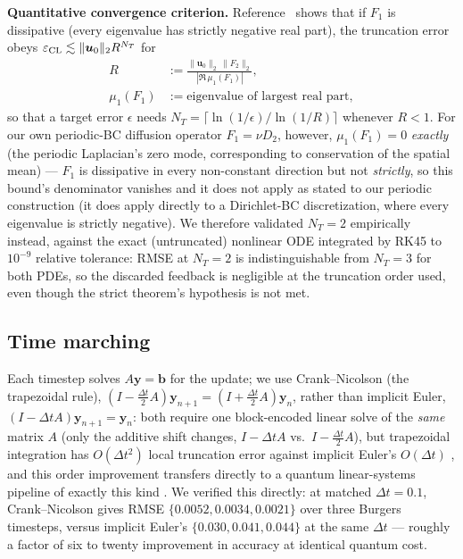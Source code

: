 \documentclass[aps,pra,twocolumn,notitlepage,superscriptaddress,floatfix,10pt]{revtex4-2}
\newcommand{\norm}[1]{\lVert #1 \rVert}
\begin{document}
\textbf{Quantitative convergence criterion.} Reference~\cite{Liu2021} shows that if $F_1$ is
dissipative (every eigenvalue has strictly negative real part), the truncation error obeys
$\varepsilon_{\rm CL}\lesssim\norm{\bm u_0}_2R^{N_T}$ for
\begin{align}
R&:=\frac{\norm{\bm u_0}_2\,\norm{F_2}_2}{|\Re\,\mu_1(F_1)|},\\
\mu_1(F_1)&:=\text{eigenvalue of largest real part},
\end{align}
so that a target error $\epsilon$ needs $N_T=\lceil\ln(1/\epsilon)/\ln(1/R)\rceil$ whenever $R<1$. For
our own periodic-BC diffusion operator $F_1=\nu D_2$, however, $\mu_1(F_1)=0$ \emph{exactly} (the
periodic Laplacian's zero mode, corresponding to conservation of the spatial mean) --- $F_1$ is
dissipative in every non-constant direction but not \emph{strictly}, so this bound's denominator
vanishes and it does not apply as stated to our periodic construction (it does apply directly to a
Dirichlet-BC discretization, where every eigenvalue is strictly negative). We therefore validated
$N_T=2$ empirically instead, against the exact (untruncated) nonlinear ODE integrated by RK45 to
$10^{-9}$ relative tolerance: RMSE at $N_T=2$ is indistinguishable from $N_T=3$ for both PDEs, so the
discarded feedback is negligible at the truncation order used, even though the strict theorem's
hypothesis is not met.

\subsection{Time marching}
Each timestep solves $A\bm y=\bm b$ for the update; we use Crank--Nicolson (the trapezoidal rule),
$(I-\tfrac{\Delta t}2A)\bm y_{n+1}=(I+\tfrac{\Delta t}2A)\bm y_n$, rather than implicit Euler,
$(I-\Delta tA)\bm y_{n+1}=\bm y_n$: both require one block-encoded linear solve of the \emph{same}
matrix $A$ (only the additive shift changes, $I-\Delta tA$ vs.\ $I-\tfrac{\Delta t}2A$), but
trapezoidal integration has $O(\Delta t^2)$ local truncation error against implicit Euler's
$O(\Delta t)$ \cite{LeVeque2007}, and this order improvement transfers directly to a quantum
linear-systems pipeline of exactly this kind \cite{Costa2025}. We verified this directly: at matched
$\Delta t=0.1$, Crank--Nicolson gives RMSE $\{0.0052,0.0034,0.0021\}$ over three Burgers timesteps,
versus implicit Euler's $\{0.030,0.041,0.044\}$ at the same $\Delta t$ --- roughly a factor of six to
twenty improvement in accuracy at identical quantum cost.
\end{document}
